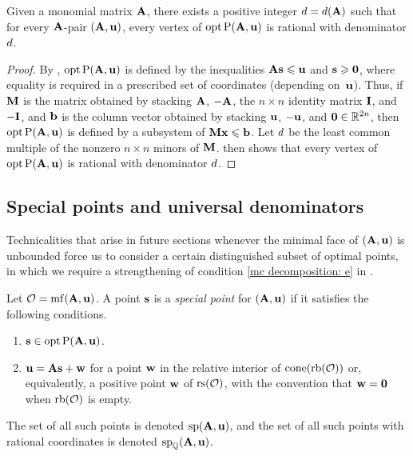 \documentclass{article}
\begin{document}
\begin{theorem}
   \label{uniform denominators for vertices:  T}
   Given a monomial matrix $\mathbf{A}$, there exists a positive integer $d = d(\mathbf{A})$ such that for every $\mathbf{A}$-pair $(\mathbf{A}, \mathbf{u})$, every vertex of $\operatorname{opt} \mathrm{P}(\mathbf{A}, \mathbf{u})$ is rational with denominator $d$.
\end{theorem}

\begin{proof}
   By , $\operatorname{opt} \mathrm{P}(\mathbf{A},\mathbf{u})$ is defined by the inequalities $\mathbf{A}\mathbf{s} \leqslant \mathbf{u}$ and $\mathbf{s}\geqslant \mathbf{0}$, where equality is required in a prescribed set of coordinates (depending on~$\mathbf{u}$).
   Thus, if $\mathbf{M}$ is the matrix obtained by stacking $\mathbf{A}$, $-\mathbf{A}$, the $n \times n$ identity matrix $\mathbf{I}$, and $-\mathbf{I}$, and $\mathbf{b}$ is the column vector obtained by stacking $\mathbf{u}$, $-\mathbf{u}$, and $\mathbf{0}\in \mathbb{R}^{2n}$, then $\operatorname{opt} \mathrm{P}(\mathbf{A},\mathbf{u})$ is defined by a subsystem of $\mathbf{M} \mathbf{x} \leqslant \mathbf{b}$.
   Let $d$ be the least common multiple of the nonzero $n\times n$ minors of $\mathbf{M}$.
    then shows that every vertex of $\operatorname{opt} \mathrm{P}(\mathbf{A},\mathbf{u})$ is rational with denominator $d$.
\end{proof}

\subsection{Special points and universal denominators}

Technicalities that arise in future sections whenever the minimal face of $(\mathbf{A}, \mathbf{u})$ is unbounded force us to consider a certain distinguished subset of optimal points, in which we require a strengthening of condition \ref{mc decomposition: e} in .

\begin{definition}
   \label{mc: D}
   Let $\mathcal{O} = \operatorname{mf}(\mathbf{A}, \mathbf{u})$.
   A point $\mathbf{s}$ is a \emph{special point} for $(\mathbf{A}, \mathbf{u})$ if it satisfies the following conditions.
   \begin{enumerate}
      \item $\mathbf{s} \in \operatorname{opt} \mathrm{P}(\mathbf{A}, \mathbf{u})$.
      \item \label{item: special condition of special points}
      $\mathbf{u} = \mathbf{A} \mathbf{s} + \mathbf{w}$ for a point $\mathbf{w}$ in the relative interior of $\operatorname{cone}(\operatorname{rb}(\mathcal{O}))$ or, equivalently, a positive point $\mathbf{w}$ of $\operatorname{rs}(\mathcal{O})$, with the convention that $\mathbf{w}=\mathbf{0}$ when $\operatorname{rb}(\mathcal{O})$ is empty.
   \end{enumerate}
   The set of all such points is denoted $\operatorname{sp}(\mathbf{A}, \mathbf{u})$, and the set of all such points with rational coordinates is denoted $\operatorname{sp}_{\mathbb{Q}}(\mathbf{A}, \mathbf{u})$.
\end{definition}
\end{document}
